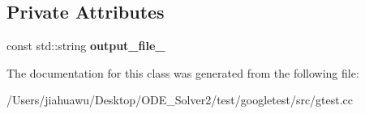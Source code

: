 \subsection*{Private Attributes}
\begin{DoxyCompactItemize}
\item 
\mbox{\label{classtesting_1_1internal_1_1_json_unit_test_result_printer_a0471c1f94083f864b5e4d98fd9e80207}} 
const std\+::string {\bfseries output\+\_\+file\+\_\+}
\end{DoxyCompactItemize}


The documentation for this class was generated from the following file\+:\begin{DoxyCompactItemize}
\item 
/\+Users/jiahuawu/\+Desktop/\+O\+D\+E\+\_\+\+Solver2/test/googletest/src/gtest.\+cc\end{DoxyCompactItemize}
